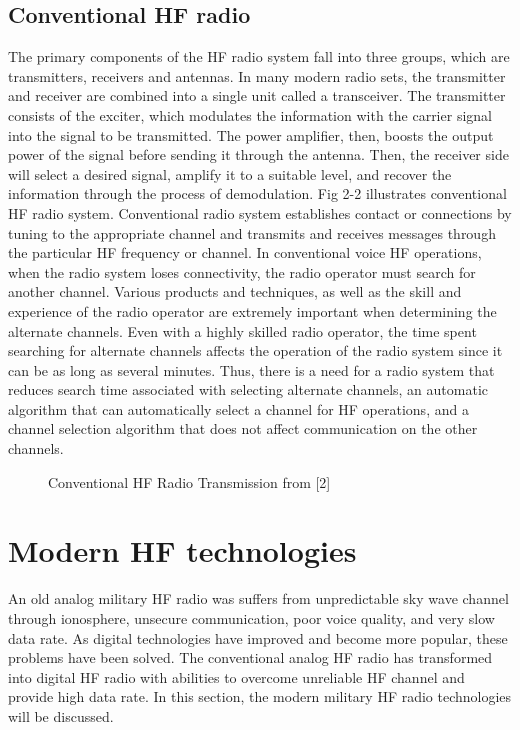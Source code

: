 \documentclass[conference]{IEEEtran}
\begin{document}
\subsection{Conventional HF radio}
The primary components of the HF radio system fall into three groups, which are transmitters, receivers and antennas. In many modern radio sets, the transmitter and receiver are combined into a single unit called a transceiver. The transmitter consists of the exciter, which modulates the information with the carrier signal into the signal to be transmitted. The power amplifier, then, boosts the output power of the signal before sending it through the antenna. Then, the receiver side will select a desired signal, amplify it to a suitable level, and recover the information through the process of demodulation. Fig 2-2 illustrates conventional HF radio system.
Conventional radio system establishes contact or connections by tuning to the appropriate channel and transmits and receives messages through the particular HF frequency or channel. In conventional voice HF operations, when the radio system loses connectivity, the radio operator must search for another channel. Various products and techniques, as well as the skill and experience of the radio operator are extremely important when determining the alternate channels. Even with a highly skilled radio operator, the time spent searching for alternate channels affects the operation of the radio system since it can be as long as several minutes. Thus, there is a need for a radio system that reduces search time associated with selecting alternate channels, an automatic algorithm that can automatically select a channel for HF operations, and a channel selection algorithm that does not affect communication on the other channels.

\begin{figure}[h!]
	\centering
	\caption{Conventional HF Radio Transmission from [2]}
\end{figure}

\section{Modern HF technologies}
An old analog military HF radio was suffers from unpredictable sky wave channel through ionosphere, unsecure communication, poor voice quality, and very slow data rate. As digital technologies have improved and become more popular, these problems have been solved. The conventional analog HF radio has transformed into digital HF radio with abilities to overcome unreliable HF channel and provide high data rate. In this section, the modern military HF radio technologies will be discussed.
\end{document}
